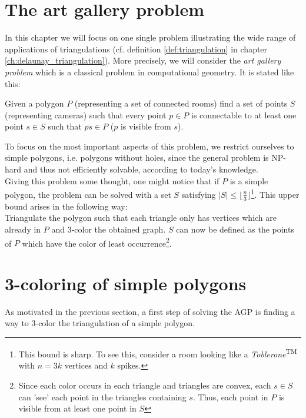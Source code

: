 \section{The art gallery problem}
    In this chapter we will focus on one single problem illustrating the wide range of applications of triangulations (cf. definition \ref{def:triangulation} in chapter \ref{ch:delaunay_triangulation}). More precisely, we will consider the \emph{art gallery problem} which is a classical problem in computational geometry. It is stated like this: 

    \begin{definition}
        \label{def:art_gallery_problem}
        Given a polygon $P$ (representing a set of connected rooms) find a set of points $S$ (representing cameras) such that every point $p \in P$ is connectable to at least one point $s \in S$ such that $\overline{ps} \in P$ ($p$ is visible from $s$).
    \end{definition}

    To focus on  the most important aspects of this problem, we restrict ourselves to simple polygons, i.e. polygons without holes, since the general problem is NP-hard and thus not efficiently solvable, according to today's knowledge. \\
    Giving this problem some thought, one might notice that if $P$ is a simple polygon, the problem can be solved with a set $S$ satisfying $\vert S \vert \leq \lfloor \frac{n}{3} \rfloor$\footnote{This bound is sharp. To see this, consider a room looking like a \emph{Toblerone}\textsuperscript{TM} with $n = 3k$ vertices and $k$ spikes.}. This upper bound arises in the following way: \\ 
    Triangulate the polygon such that each triangle only has vertices which are already in $P$ and 3-color the obtained graph. $S$ can now be defined as the points of $P$ which have the color of least occurrence\footnote{Since each color occurs in each triangle and triangles are convex, each $s \in S$ can 'see' each point in the triangles containing $s$. Thus, each point in $P$ is visible from at least one point in $S$}. 

\section{3-coloring of simple polygons}
    As motivated in the previous section, a first step of solving the AGP is finding a way to 3-color the triangulation of a simple polygon. 

